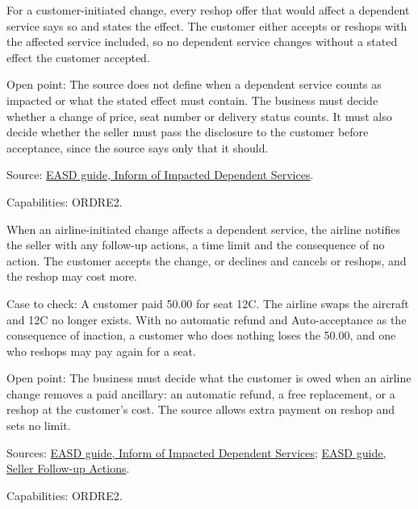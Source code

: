 \begin{theorem}
  \label{thm:ancillaries-dependent-impact-disclosed}
  \notready
  For a customer-initiated change, every reshop offer that would affect a
  dependent service says so and states the effect. The customer either
  accepts or reshops with the affected service included, so no dependent
  service changes without a stated effect the customer accepted.

  Open point: The source does not define when a dependent service counts as
  impacted or what the stated effect must contain. The business must decide
  whether a change of price, seat number or delivery status counts. It must
  also decide whether the seller must pass the disclosure to the customer
  before acceptance, since the source says only that it should.

  Source: \href{https://standards.atlassian.net/wiki/spaces/EASD/pages/672825400}{EASD guide, Inform of Impacted Dependent Services}.

  Capabilities: ORDRE2.
\end{theorem}

\begin{definition}
  \label{def:ancillaries-involuntary-dependent-loss}
  \notready
  When an airline-initiated change affects a dependent service, the airline
  notifies the seller with any follow-up actions, a time limit and the
  consequence of no action. The customer accepts the change, or declines and
  cancels or reshops, and the reshop may cost more.

  Case to check: A customer paid 50.00 for seat 12C. The airline swaps the
  aircraft and 12C no longer exists. With no automatic refund and
  Auto-acceptance as the consequence of inaction, a customer who does
  nothing loses the 50.00, and one who reshops may pay again for a seat.

  Open point: The business must decide what the customer is owed when an
  airline change removes a paid ancillary: an automatic refund, a free
  replacement, or a reshop at the customer's cost. The source allows extra
  payment on reshop and sets no limit.

  Sources: \href{https://standards.atlassian.net/wiki/spaces/EASD/pages/672825400}{EASD guide, Inform of Impacted Dependent Services};
  \href{https://standards.atlassian.net/wiki/spaces/EASD/pages/574849094}{EASD guide, Seller Follow-up Actions}.

  Capabilities: ORDRE2.
\end{definition}

